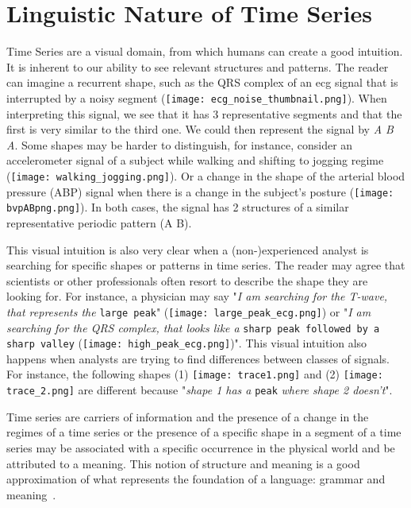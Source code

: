 \section{Linguistic Nature of Time Series} 
\label{sub:context1}

Time Series are a visual domain, from which humans can create a good intuition. It is inherent to our ability to see relevant structures and patterns. The reader can imagine a recurrent shape, such as the \textcolor{myblue}{QRS complex} of an \gls{ecg} signal that is interrupted by a \textcolor{myred}{noisy} segment (\texttt{[image: ecg\_noise\_thumbnail.png]}). When interpreting this signal, we see that it has 3 representative segments and that the first is very similar to the third one. We could then represent the signal by \textit{\textcolor{myblue}{A} \textcolor{myred}{B} \textcolor{myblue}{A}}. Some shapes may be harder to distinguish, for instance, consider an accelerometer signal of a subject while \textcolor{myblue}{walking} and shifting to \textcolor{mygreen}{jogging} regime (\texttt{[image: walking\_jogging.png]}). Or a change in the shape of the arterial blood pressure (ABP) signal when there is a change in the subject's posture (\texttt{[image: bvpABpng.png]}). In both cases, the signal has 2 structures of a similar representative periodic pattern (\textcolor{myblue}{A} \textcolor{mygreen}{B}).

This visual intuition is also very clear when a (non-)experienced analyst is searching for specific shapes or patterns in time series. The reader may agree that scientists or other professionals often resort to describe the shape they are looking for. For instance, a physician may say "\textit{I am searching for the T-wave, that represents the} \texttt{large peak}" (\texttt{[image: large\_peak\_ecg.png]}) or "\textit{I am searching for the QRS complex, that looks like a} \texttt{sharp peak followed by a sharp valley} (\texttt{[image: high\_peak\_ecg.png]})". This visual intuition also happens when analysts are trying to find differences between classes of signals. For instance, the following shapes (1) \texttt{[image: trace1.png]} and (2) \texttt{[image: trace\_2.png]} are different because "\textit{shape 1 has a} \texttt{peak} \textit{where shape 2 doesn't}". 

Time series are carriers of information and the presence of a change in the regimes of a time series or the presence of a specific shape in a segment of a time series may be associated with a specific occurrence in the physical world and be attributed to a meaning. This notion of structure and meaning is a good approximation of what represents the foundation of a language: grammar and meaning~\cite{grammar}.


